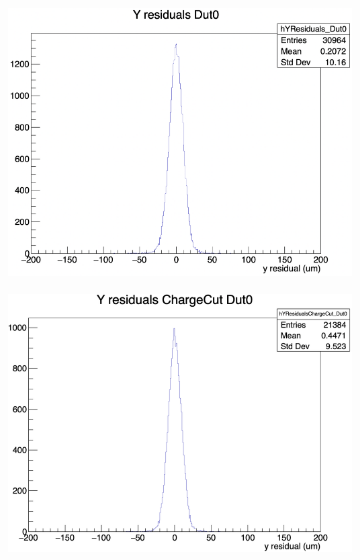 \begin{figure}[H]
    \begin{subfigure}[b]{0.3\textwidth}
        \includegraphics[width=\textwidth]{images/YRes_13planes.png}
        \caption{}
    \end{subfigure}
    \hfill
    \begin{subfigure}[b]{0.33\textwidth}
        \includegraphics[width=\textwidth]{images/YRes_4pixel.png}
        \caption{}
    \end{subfigure}
    \hfill
    \begin{subfigure}[b]{0.3\textwidth}

\end{subfigure}
\end{figure}
